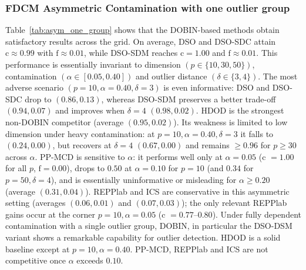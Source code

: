 \documentclass[12pt]{article}
\begin{document}
\subsubsection*{FDCM Asymmetric Contamination with one outlier group}

Table~\ref{tab:asym_one_group} shows that the DOBIN-based methods obtain satisfactory results across the grid. On average, DSO and DSO-SDC attain \(\text{c}\approx0.99\) with \(\text{f}\approx0.01\), while DSO-SDM reaches \(\text{c}=1.00\) and \(\text{f}\approx0.01\). This performance is essentially invariant to dimension \((p\in\{10,30,50\})\), contamination \((\alpha\in[0.05,0.40])\) and outlier distance \((\delta\in\{3,4\})\). The most adverse scenario \((p=10,\alpha=0.40,\delta=3)\) is even informative: DSO and DSO-SDC drop to \((0.86,0.13)\), whereas DSO-SDM preserves a better trade-off \((0.94,0.07)\) and improves when \(\delta=4\) \((0.98,0.02)\). HDOD is the strongest non-DOBIN competitor (average \((0.95,0.02)\)). Its weakness is limited to low dimension under heavy contamination: at \(p=10,\alpha=0.40,\delta=3\) it falls to \((0.24,0.00)\), but recovers at \(\delta=4\) \((0.67,0.00)\) and remains \(\ge 0.96\) for \(p\ge 30\) across \(\alpha\). PP-MCD is sensitive to \(\alpha\): it performs well only at \(\alpha=0.05\) (c \(=1.00\) for all \(p\), \(\text{f}=0.00\)), drops to \(0.50\) at \(\alpha=0.10\) for \(p=10\) (and \(0.34\) for \(p=50,\delta=4\)), and is essentially uninformative or misleading for \(\alpha\ge 0.20\) (average \((0.31,0.04)\)). 
REPPlab and ICS are conservative in this asymmetric setting (averages \((0.06,0.01)\) and \((0.07,0.03)\)); the only relevant REPPlab gains occur at the corner \(p=10,\alpha=0.05\) (c \(=0.77\)–\(0.80\)). Under fully dependent contamination with a single outlier group, DOBIN, in particular the DSO-DSM variant shows a remarkable capability for outlier detection. HDOD is a solid baseline except at \(p=10,\alpha=0.40\). PP-MCD, REPPlab and ICS are not competitive once \(\alpha\) exceeds \(0.10\).
\end{document}
